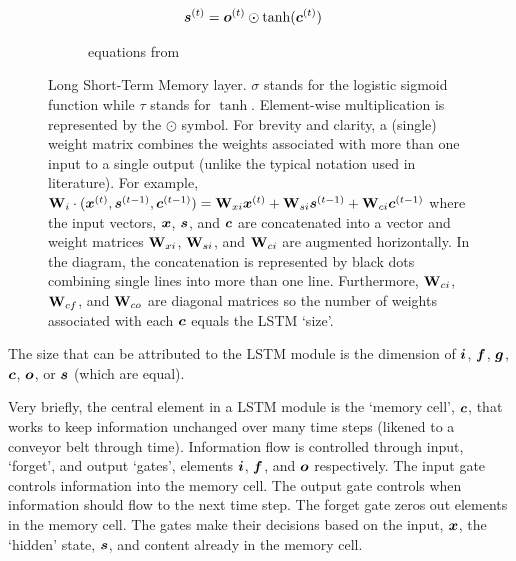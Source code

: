 \begin{figure}[H]
\begin{subfigure}[]{\textwidth}
\begin{subequations}
\begin{align}
        \boldsymbol{s}\sp{(t)}
        &=
          \boldsymbol{o}\sp{(t)} \odot
          \tanh
          (
          \boldsymbol{c}\sp{(t)}
          )
      \end{align}
    \end{subequations}
    \caption{equations from \cite{Graves2013b}}
    \label{eqn:lstm}
  \end{subfigure}
  \caption[Long Short-Term Memory layer]{Long Short-Term Memory layer.
%
$\sigma$ stands for the logistic sigmoid function while $\tau$ stands for $\tanh$.
%
Element-wise multiplication is represented by the $\odot$ symbol.
%
For brevity and clarity, a (single) weight matrix combines the weights associated with more than one input to a single output (unlike the typical notation used in literature).
%
For example, $\mathbf{W}_i \cdot(\boldsymbol{x}\sp{(t)},\boldsymbol{s}\sp{(t-1)},\boldsymbol{c}\sp{(t-1)})=\mathbf{W}_{xi}\boldsymbol{x}\sp{(t)}+\mathbf{W}_{si}\boldsymbol{s}\sp{(t-1)}+\mathbf{W}_{ci}\boldsymbol{c}\sp{(t-1)}$ where the input vectors, $\boldsymbol{x}$, $\boldsymbol{s}$, and $\boldsymbol{c}$ are concatenated into a vector  and weight matrices $\mathbf{W}_{xi}$, $\mathbf{W}_{si}$, and $\mathbf{W}_{ci}$ are augmented horizontally. %
%
In the diagram, the concatenation is represented by black dots combining single lines into more than one line.
%
Furthermore, $\mathbf{W}_{ci}$, $\mathbf{W}_{cf}$, and $\mathbf{W}_{co}$ are diagonal matrices so the number of weights associated with each $\boldsymbol{c}$ equals the LSTM `size'.
}
  \label{fig:lstmfig}
\end{figure}


The size that can be attributed to the LSTM module is the dimension of $\boldsymbol{i}$, $\boldsymbol{f}$, $\boldsymbol{g}$, $\boldsymbol{c}$, $\boldsymbol{o}$, or $\boldsymbol{s}$ (which are equal).


Very briefly, the central element in a LSTM module is the `memory cell', $\boldsymbol{c}$, that works to keep information unchanged over many time steps (likened to a conveyor belt through time).
%
Information flow is controlled through input, `forget', and output `gates', elements $\boldsymbol{i}$, $\boldsymbol{f}$, and $\boldsymbol{o}$ respectively.
%
The input gate controls information into the memory cell.
%
The output gate controls when information should flow to the next time step.
%
The forget gate zeros out elements in the memory cell.
%
The gates make their decisions based on the input, $\boldsymbol{x}$, the `hidden' state, $\boldsymbol{s}$, and content already in the memory cell.
%


